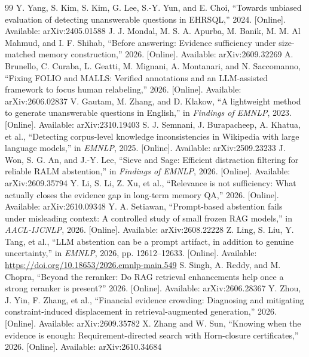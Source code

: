 \documentclass[conference]{IEEEtran}
\begin{document}
\begin{thebibliography}{99}
 Y. Yang, S. Kim, S. Kim, G. Lee, S.-Y. Yun, and E. Choi, ``Towards unbiased evaluation of detecting unanswerable questions in EHRSQL,'' 2024. [Online]. Available: arXiv:2405.01588
 J. J. Mondal, M. S. A. Apurba, M. Banik, M. M. Al Mahmud, and I. F. Shihab, ``Before answering: Evidence sufficiency under size-matched memory construction,'' 2026. [Online]. Available: arXiv:2609.32269
 A. Brunello, C. Curaba, L. Geatti, M. Mignani, A. Montanari, and N. Saccomanno, ``Fixing FOLIO and MALLS: Verified annotations and an LLM-assisted framework to focus human relabeling,'' 2026. [Online]. Available: arXiv:2606.02837
 V. Gautam, M. Zhang, and D. Klakow, ``A lightweight method to generate unanswerable questions in English,'' in \emph{Findings of EMNLP}, 2023. [Online]. Available: arXiv:2310.19403
 S. J. Semnani, J. Burapacheep, A. Khatua, et al., ``Detecting corpus-level knowledge inconsistencies in Wikipedia with large language models,'' in \emph{EMNLP}, 2025. [Online]. Available: arXiv:2509.23233
 J. Won, S. G. An, and J.-Y. Lee, ``Sieve and Sage: Efficient distraction filtering for reliable RALM abstention,'' in \emph{Findings of EMNLP}, 2026. [Online]. Available: arXiv:2609.35794
 Y. Li, S. Li, Z. Xu, et al., ``Relevance is not sufficiency: What actually closes the evidence gap in long-term memory QA,'' 2026. [Online]. Available: arXiv:2610.09348
 Y. A. Setiawan, ``Prompt-based abstention fails under misleading context: A controlled study of small frozen RAG models,'' in \emph{AACL-IJCNLP}, 2026. [Online]. Available: arXiv:2608.22228
 Z. Ling, S. Liu, Y. Tang, et al., ``LLM abstention can be a prompt artifact, in addition to genuine uncertainty,'' in \emph{EMNLP}, 2026, pp. 12612--12633. [Online]. Available: \url{https://doi.org/10.18653/2026.emnlp-main.549}
 S. Singh, A. Reddy, and M. Chopra, ``Beyond the reranker: Do RAG retrieval enhancements help once a strong reranker is present?'' 2026. [Online]. Available: arXiv:2606.28367
Y. Zhou, J. Yin, F. Zhang, et al., ``Financial evidence crowding: Diagnosing and mitigating constraint-induced displacement in retrieval-augmented generation,'' 2026. [Online]. Available: arXiv:2609.35782
 X. Zhang and W. Sun, ``Knowing when the evidence is enough: Requirement-directed search with Horn-closure certificates,'' 2026. [Online]. Available: arXiv:2610.34684

\end{thebibliography}
\end{document}
